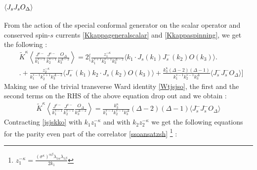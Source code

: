 \documentclass[a4paper,11pt]{article}
\begin{document}
\subsection{$\ev{J_sJ_s O_{\Delta}}$}
\label{appJsJsOdetails}
From the action of the special conformal generator on the scalar operator and conserved spin-$s$ currents \eqref{Kkappageneralscalar} and \eqref{Kkappaspinning}, we get the following : 
\begin{align}
\label{kkappaJJO}
&\widetilde{K}^{\kappa}\left\langle \frac{J^{s-}}{k_1^{s-1}}\frac{J^{s-}}{k_2^{s-1}}\frac{O_{\Delta}}{k_3^{\Delta-2}} \right\rangle = 2\bigg[\frac{z_1^{-\kappa}}{k_1^{s+1}k_2^{s-1} k_3^{\Delta-2}} \langle k_1\cdot J_s(k_1)J_s^-(k_2) O(k_3) \rangle\bigg. \nonumber\\[5 pt]
&\bigg.+\frac{z_2^{-\kappa}}{k_1^{s-1}k_2^{s+1} k_3^{\Delta-2}} \langle J_s^-(k_1) k_2\cdot J_s(k_2) O(k_3) \rangle+\frac{k_3^{\kappa}(\Delta-2)(\Delta-1)}{k_1^{s-1} k_2^{s-1} k_3^{\Delta}}\langle J_s^-J_s^-O_{\Delta}\rangle\bigg]
\end{align}
Making use of the trivial transverse Ward identity \eqref{Wtjsjso}, the first and the second terms on the RHS of the above equation drop out and we obtain :
\begin{align}\label{jsjskko}
\widetilde{K}^{\kappa}\left\langle \frac{J^{s-}}{k_1^{s-1}}\frac{J^{s-}}{k_2^{s-1}}\frac{O_{\Delta}}{k_3^{\Delta-2}} \right\rangle = \frac{k_3^{\kappa}}{k_1^{s-1} k_2^{s-1} k_3^{\Delta}}(\Delta-2)(\Delta-1)\langle J_s^-J_s^-O_{\Delta} \rangle
\end{align}
Contracting \eqref{jsjskko} with  $k_1z_1^{-\kappa}$ and with $k_2z_2^{-\kappa}$ we get the following equations for the parity even part of the correlator \eqref{ssoansatzsh} \footnote{ $z_1^{-\kappa}=\frac{(\sigma^{\kappa})^{\alpha\beta}\lambda_{1\alpha}\lambda_{1\beta}}{2k_1}$ } :
\end{document}
